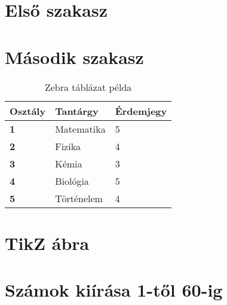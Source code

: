 \documentclass{article}
\newcounter{kulcsgondolat}
\begin{document}
	
	
	\section{Első szakasz}
	\begin{sajatkornyezet}[Kulcsgondolatok]
		\gondolat\lipsum[1]
		\gondolat\lipsum[2]
	\end{sajatkornyezet}
	
	\section{Második szakasz}
	\setcounter{kulcsgondolat}{0} 
	\begin{sajatkornyezet}[Kulcsgondolatok]
		\gondolat\lipsum[3]
		\gondolat\lipsum[4]
	\end{sajatkornyezet}
	
	
	\begin{table}[ht]
		\centering
		\begin{tabular}{|Z{white}{black}|Z{gray!20}{black}|Z{white}{black}|}
			\hline
			\textbf{Osztály} & \textbf{Tantárgy} & \textbf{Érdemjegy} \\
			\hline
			\textbf{1} & Matematika & 5 \\
			\textbf{2} & Fizika & 4 \\
			\textbf{3} & Kémia & 3 \\
			\textbf{4} & Biológia & 5 \\
			\textbf{5} & Történelem & 4 \\
			\hline
		\end{tabular}
		\caption{Zebra táblázat példa}
		\label{tab:zebra}
	\end{table}
	
	
	\section{TikZ ábra}

	
	\section{Számok kiírása 1-től 60-ig}
	\begin{multicols}{3}
		\setcounter{counter}{1} 

	\end{multicols}
\end{document}
